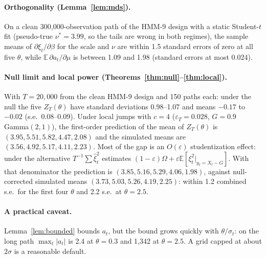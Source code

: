 \documentclass[11pt,a4paper]{article}
\theoremstyle{definition}
\theoremstyle{remark}
\newcommand{\E}{\mathbb{E}}
\begin{document}
\paragraph{Orthogonality (Lemma~\ref{lem:mds}).} On a clean 300{,}000-observation path of the HMM-9 design with a static Student-$t$ fit (pseudo-true $\nu^*=3.99$, so the tails are wrong in both regimes), the sample means of $\partial\xi_t/\partial\beta$ for the scale and $\nu$ are within 1.5 standard errors of zero at all five $\theta$, while $\E\,\partial a_t/\partial\mu$ is between 1.09 and 1.98 (standard errors at most 0.024).

\paragraph{Null limit and local power (Theorems~\ref{thm:null}--\ref{thm:local}).} With $T=20{,}000$ from the clean HMM-9 design and 150 paths each: under the null the five $Z_T(\theta)$ have standard deviations 0.98--1.07 and means $-0.17$ to $-0.02$ (s.e.\ 0.08--0.09). Under local jumps with $c=4$ ($\varepsilon_T=0.028$, $G=0.9\,$Gamma$(2,1)$), the first-order prediction of the mean of $Z_T(\theta)$ is $(3.95,5.51,5.82,4.47,2.08)$ and the simulated means are $(3.56,4.92,5.17,4.11,2.23)$. Most of the gap is an $O(\varepsilon)$ studentization effect: under the alternative $T^{-1}\sum\hat\xi_t^2$ estimates $(1-\varepsilon)\Omega+\varepsilon\E[\xi_t^2|_{y_t=X_t-G}]$. With that denominator the prediction is $(3.85,5.16,5.29,4.06,1.98)$, against null-corrected simulated means $(3.73,5.03,5.26,4.19,2.25)$: within 1.2 combined s.e.\ for the first four $\theta$ and 2.2 s.e.\ at $\theta=2.5$.

\paragraph{A practical caveat.} Lemma~\ref{lem:bounded} bounds $a_t$, but the bound grows quickly with $\theta/\sigma_t$: on the long path $\max_t|a_t|$ is 2.4 at $\theta=0.3$ and 1{,}342 at $\theta=2.5$. A grid capped at about $2\hat\sigma$ is a reasonable default.
\end{document}
